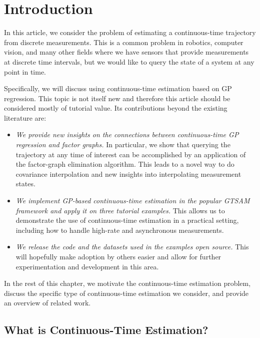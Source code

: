 
\chapter{Introduction}

In this article, we consider the problem of estimating a continuous-time trajectory from discrete measurements.  This is a common problem in robotics, computer vision, and many other fields where we have sensors that provide measurements at discrete time intervals, but we would like to query the state of a system at any point in time.  

Specifically, we will discuss using continuous-time estimation based on \ac{GP} regression.  This topic is not itself new and therefore this article should be considered mostly of tutorial value.  Its contributions beyond the existing literature are:
\begin{itemize}
\item {\em We provide new insights on the connections between continuous-time \ac{GP} regression and factor graphs.}  In particular, we show that querying the trajectory at any time of interest can be accomplished by an application of the factor-graph elimination algorithm.  This leads to a novel way to do covariance interpolation and new insights into interpolating measurement states.

\item {\em We implement \ac{GP}-based continuous-time estimation in the popular \ac{GTSAM} framework and apply it on three tutorial examples.}  This allows us to demonstrate the use of continuous-time estimation in a practical setting, including how to handle high-rate and asynchronous measurements.

\item {\em We release the code and the datasets used in the examples open source.}  This will hopefully make adoption by others easier and allow for further experimentation and development in this area.
\end{itemize}
In the rest of this chapter, we motivate the continuous-time estimation problem, discuss the specific type of continuous-time estimation we consider, and provide an overview of related work.

\section{What is Continuous-Time Estimation?}

